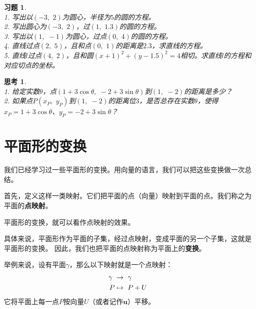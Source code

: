 \documentclass[12pt,UTF8]{ctexbook}
\newtheorem{sk}{思考}[section]
\newtheorem{xt}{习题}[section]
\begin{document}
\begin{xt}
    \mbox{}\\
    1. 写出以$(-3, \,\,2)$为圆心，半径为$5$的圆的方程。\\
    2. 写出圆心为$(-3, \,\,2)$，过$(1,\,\, 1.3)$的圆的方程。\\
    3. 写出以$(1, \,\,-1)$为圆心，过点$(0,\,\, 4)$的圆的方程。\\
    4. 直线过点$(2,\,\,5)$，且和点$(0,\,\,1)$的距离是$2.3$，求直线的方程。\\
    5. 直线$l$过点$(4,\,\,2)$，且和圆$(x+1)^2 + (y - 1.5)^2 = 4$相切。求直线$l$的方程和对应切点的坐标。
\end{xt}

\begin{sk}
    \mbox{}\\
    1. 给定实数$\theta$，点$(1 + 3\cos\theta, \,\, -2 + 3\sin\theta)$到$(1, \,\,-2)$的距离是多少？\\
    2. 如果点$P(x_P, \,\,y_P)$到$(1, \,\,-2)$的距离位$3$，是否总存在实数$\theta$，使得$x_P = 1 + 3\cos\theta$、$y_P = -2 + 3\sin\theta$？
\end{sk}

\section{平面形的变换}
我们已经学习过一些平面形的变换。用向量的语言，我们可以把这些变换做一次总结。

首先，定义这样一类映射。它们把平面的点（向量）映射到平面的点。我们称之为平面的\textbf{点映射}。

平面形的变换，就可以看作点映射的效果。

具体来说，平面形作为平面的子集，经过点映射，变成平面的另一个子集，这就是平面形的变换。
因此，我们也把平面的点映射称为平面上的\textbf{变换}。

举例来说，设有平面$\gamma$，那么以下映射就是一个点映射：
\begin{align}
    \gamma \,\,&\rightarrow \,\, \gamma \notag \\
    P &\mapsto \,\, P + U \notag
\end{align}
它将平面上每一点$P$按向量$U$（或者记作$\mathbf{u}$）平移。

\end{document}
